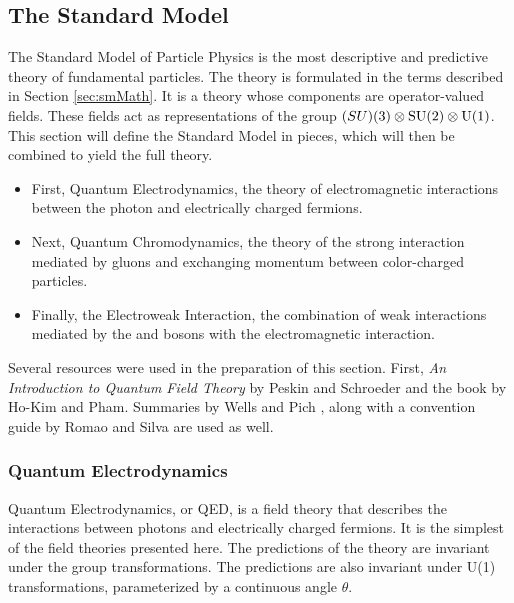 \subsection{The Standard Model}

The Standard Model of Particle Physics is the most descriptive and predictive theory of fundamental particles.
The theory is formulated in the terms described in Section \ref{sec:smMath}.
It is a theory whose components are operator-valued fields.
These fields act as representations of the group $\text(SU)(3)\otimes\text{SU}(2)\otimes\text{U}(1)$.
This section will define the Standard Model in pieces, which will then be combined to yield the full theory.
\begin{itemize}
    \item First, Quantum Electrodynamics, the theory of electromagnetic interactions between the photon and electrically charged fermions.
    \item Next, Quantum Chromodynamics, the theory of the strong interaction mediated by gluons and exchanging momentum between color-charged particles.
    \item Finally, the Electroweak Interaction, the combination of weak interactions mediated by the \W and \Z bosons with the electromagnetic interaction.
\end{itemize}

Several resources were used in the preparation of this section.
First, \emph{An Introduction to Quantum Field Theory} by Peskin and Schroeder \cite{peskin} and the book by Ho-Kim and Pham.\cite{hokim}
Summaries by Wells \cite{wells} and Pich \cite{pich}, along with a convention guide by Romao and Silva\cite{romao} are used as well.

\subsubsection{Quantum Electrodynamics}

Quantum Electrodynamics, or QED, is a field theory that describes the interactions between photons and electrically charged fermions.
It is the simplest of the field theories presented here.
The predictions of the theory are invariant under the \poincare group transformations.
The predictions are also invariant under U(1) transformations, parameterized by a continuous angle $ \theta $.

